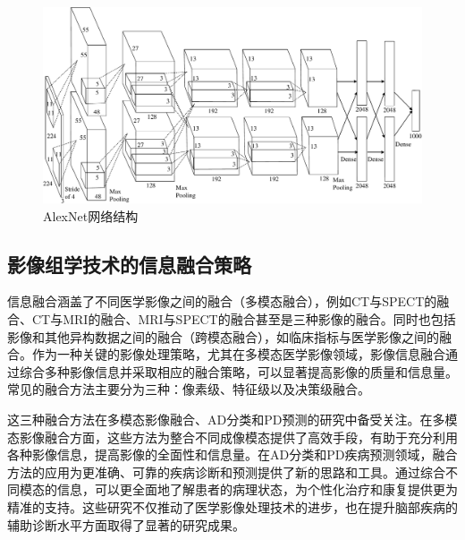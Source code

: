    \begin{figure}[htbp]
      \centering  
      \includegraphics[width=0.9\linewidth]{figs/alexnet.pdf}
      \caption{AlexNet\cite{krizhevsky2012imagenet}网络结构}\label{Alexnet}
    \end{figure}



\subsection{影像组学技术的信息融合策略}
信息融合涵盖了不同医学影像之间的融合（多模态融合），例如CT与SPECT的融合、CT与MRI的融合、MRI与SPECT的融合甚至是三种影像的融合。同时也包括影像和其他异构数据之间的融合（跨模态融合），如临床指标与医学影像之间的融合。作为一种关键的影像处理策略，尤其在多模态医学影像领域，影像信息融合通过综合多种影像信息并采取相应的融合策略，可以显著提高影像的质量和信息量。常见的融合方法主要分为三种：像素级、特征级以及决策级融合。

这三种融合方法在多模态影像融合、AD分类和PD预测的研究中备受关注。在多模态影像融合方面，这些方法为整合不同成像模态提供了高效手段，有助于充分利用各种影像信息，提高影像的全面性和信息量。在AD分类和PD疾病预测领域，融合方法的应用为更准确、可靠的疾病诊断和预测提供了新的思路和工具。通过综合不同模态的信息，可以更全面地了解患者的病理状态，为个性化治疗和康复提供更为精准的支持。这些研究不仅推动了医学影像处理技术的进步，也在提升脑部疾病的辅助诊断水平方面取得了显著的研究成果。

